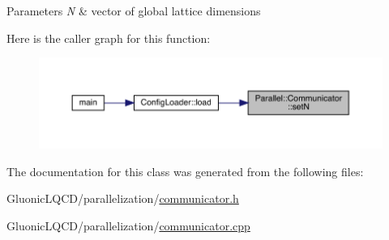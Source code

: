 \begin{DoxyParams}{Parameters}
{\em N} & vector of global lattice dimensions \\
\hline
\end{DoxyParams}
Here is the caller graph for this function\+:
\nopagebreak
\begin{figure}[H]
\begin{center}
\leavevmode
\includegraphics[width=350pt]{class_parallel_1_1_communicator_a1db417babab93c8d8bf6339ff2bab540_icgraph}
\end{center}
\end{figure}


The documentation for this class was generated from the following files\+:\begin{DoxyCompactItemize}
\item 
Gluonic\+L\+Q\+C\+D/parallelization/\mbox{\hyperlink{communicator_8h}{communicator.\+h}}\item 
Gluonic\+L\+Q\+C\+D/parallelization/\mbox{\hyperlink{communicator_8cpp}{communicator.\+cpp}}\end{DoxyCompactItemize}

